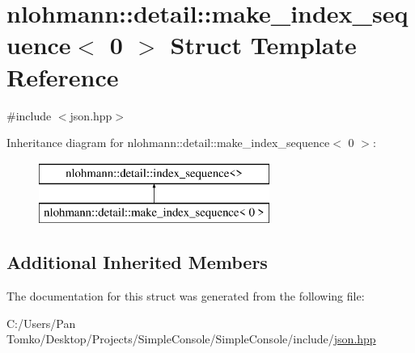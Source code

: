 \hypertarget{structnlohmann_1_1detail_1_1make__index__sequence_3_010_01_4}{}\section{nlohmann\+::detail\+::make\+\_\+index\+\_\+sequence$<$ 0 $>$ Struct Template Reference}
\label{structnlohmann_1_1detail_1_1make__index__sequence_3_010_01_4}


{\ttfamily \#include $<$json.\+hpp$>$}

Inheritance diagram for nlohmann\+::detail\+::make\+\_\+index\+\_\+sequence$<$ 0 $>$\+:\begin{figure}[H]
\begin{center}
\leavevmode
\includegraphics[height=2.000000cm]{d9/d8f/structnlohmann_1_1detail_1_1make__index__sequence_3_010_01_4}
\end{center}
\end{figure}
\subsection*{Additional Inherited Members}


The documentation for this struct was generated from the following file\+:\begin{DoxyCompactItemize}
\item 
C\+:/\+Users/\+Pan Tomko/\+Desktop/\+Projects/\+Simple\+Console/\+Simple\+Console/include/\mbox{\hyperlink{json_8hpp}{json.\+hpp}}\end{DoxyCompactItemize}
